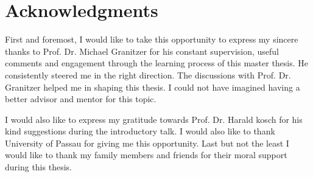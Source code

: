 \chapter*{Acknowledgments}


 First and foremost, I would like to take this opportunity to express my sincere thanks to Prof. Dr. Michael Granitzer for his constant supervision, useful comments and engagement through the learning process of this master thesis. He consistently steered me in the right direction. The discussions with Prof. Dr. Granitzer helped me in shaping this thesis. I could not have imagined having a better advisor and mentor for this topic.

I would also like to express my gratitude towards Prof. Dr. Harald kosch for his kind suggestions during the introductory talk. I would also like to thank University of Passau for giving me this opportunity. Last but not the least I would like to thank my family members and friends for their moral support during this thesis. 

